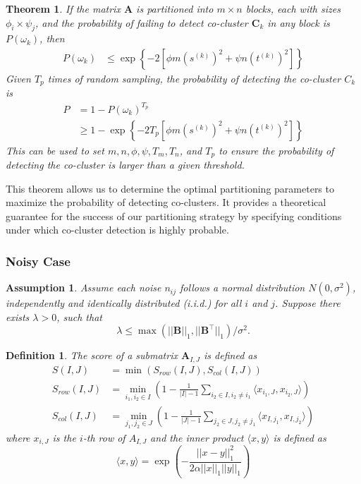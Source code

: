 \documentclass[journal]{IEEEtran}
\newtheorem{theorem}{Theorem}
\newtheorem{definition}{Definition}
\newtheorem{assumption}{Assumption}
\begin{document}
\begin{theorem}
  \label{thm:probability_co_cluster_detection}
  If the matrix $\mathbf{A}$ is partitioned into $m \times n$ blocks, each with sizes $\phi_i \times \psi_j$, and the probability of failing to detect co-cluster $\mathbf{C}_k$ in any block is $P(\omega_k)$, then
  \begin{align*}
    P(\omega_k) & \le \exp \left\{ -2 [\phi m (s^{(k)})^2 + \psi n (t^{(k)})^2] \right\}
  \end{align*}
  Given $T_p$ times of random sampling, the probability of detecting the co-cluster $C_k$ is
  \begin{align*}
    P & = 1 - P(\omega_k)^{T_p}                                                        \\
      & \ge 1 - \exp \left\{ -2 T_p [\phi m (s^{(k)})^2 + \psi n (t^{(k)})^2] \right\}
  \end{align*}
  This can be used to set $m, n, \phi, \psi, T_m, T_n$, and $T_p$ to ensure the probability of detecting the co-cluster is larger than a given threshold.
\end{theorem}

This theorem allows us to determine the optimal partitioning parameters to maximize the probability of detecting co-clusters. It provides a theoretical guarantee for the success of our partitioning strategy by specifying conditions under which co-cluster detection is highly probable.

\subsubsection{Noisy Case}
\label{subsubsec:noisy_case}

\begin{assumption}
  Assume each noise $n_{ij}$ follows a normal distribution $N(0, \sigma^2)$, independently and identically distributed (i.i.d.) for all $i$ and $j$. Suppose there exists $\lambda > 0$, such that
  $$\lambda \le \max(||\mathbf{B}||_1, ||\mathbf{B}^\top||_1)/\sigma^2.$$
\end{assumption}

\begin{definition}
  The score of a submatrix $\mathbf{A}_{I,J}$ is defined as
  \begin{align}
    S(I,J)       & = \min(S_{row}(I,J), S_{col}(I,J))                                                                                          \\
    S_{row}(I,J) & = \min_{i_1, i_2 \in I} \left(1- \frac{1}{|I|-1} \sum_{i_2 \in I, i_2 \neq i_1} \langle x_{i_1,J}, x_{i_2,J}\rangle \right) \\
    S_{col}(I,J) & = \min_{j_1, j_2 \in J} \left(1- \frac{1}{|J|-1} \sum_{j_2 \in J, j_2 \neq j_1} \langle x_{I,j_1}, x_{I,j_2}\rangle \right)
  \end{align}
  where $x_{i,J}$ is the $i$-th row of $A_{I,J}$ and the inner product $\langle x, y \rangle$ is defined as
  $$\langle x, y \rangle = \exp(-\frac{||x - y||_1^2}{2\alpha||x||_1||y||_1})$$
\end{definition}
\end{document}
